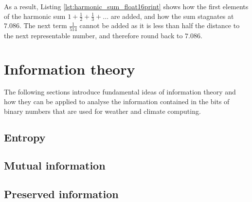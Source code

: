 As a result, Listing \ref{lst:harmonic_sum_float16print} shows how the first elements of the harmonic sum $1 + \tfrac{1}{2} + \tfrac{1}{3} + ...$ are added,
and how the sum stagnates at $7.086$. The next term $\tfrac{1}{514}$ cannot be added as it is less than half the distance to the next representable number,
and therefore round back to $7.086$.

\section{Information theory}
\label{sec:information}

The following sections introduce fundamental ideas of information theory and how they can be applied to analyse the information contained in the bits
of binary numbers that are used for weather and climate computing.

\subsection{Entropy}
\label{sec:entropy}

\subsection{Mutual information}
\label{sec:mutual_information}

\subsection{Preserved information}
\label{sec:preserved_information}


